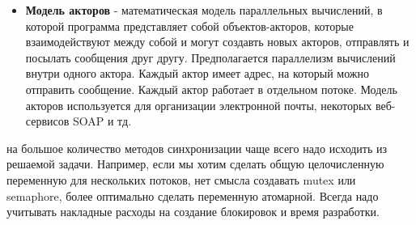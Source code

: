 {\begin{itemize}
\begin{enumerate}
					\item\textunderscore \textunderscore transaction\textunderscore relaxed \{ … \} — указание, что небезопасный код внутри блока не приводит к побочным эффектам;
					\item\textunderscore \textunderscore transaction\textunderscore cancel — явная отмена транзакции;
					\item attribute((transaction\textunderscore safe)) — указание транзакционно-безо-пасной функции;
					\item attribute((transaction\textunderscore pure)) — указание функции без побочных эффектов.
				\end{enumerate}
			\item\textbf{Модель акторов} - математическая модель параллельных вычислений, в которой программа представляет собой объектов-акторов, которые взаимодействуют между собой и могут создавть новых акторов, отправлять и посылать сообщения друг другу. Предполагается параллелизм вычислений внутри одного актора. Каждый актор имеет адрес, на который можно отправить сообщение. Каждый актор работает в отдельном потоке. Модель акторов используется для организации электронной почты, некоторых веб-сервисов SOAP и тд.
		\end{itemize}
	 на большое количество методов синхронизации чаще всего надо исходить из решаемой задачи. Например, если мы хотим сделать общую целочисленную переменную для нескольких потоков, нет смысла создавать mutex или semaphore, более оптимально сделать переменную атомарной. Всегда надо учитывать накладные расходы на создание блокировок и время разработки.
}